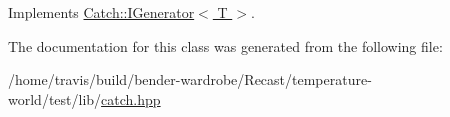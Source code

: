 Implements \hyperlink{struct_catch_1_1_i_generator_a2e317253b03e838b6065ce69719a198e}{Catch\-::\-I\-Generator$<$ T $>$}.



The documentation for this class was generated from the following file\-:\begin{DoxyCompactItemize}
\item 
/home/travis/build/bender-\/wardrobe/\-Recast/temperature-\/world/test/lib/\hyperlink{catch_8hpp}{catch.\-hpp}\end{DoxyCompactItemize}
